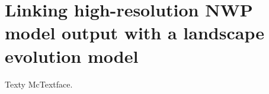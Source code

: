 \chapter{Linking high-resolution NWP model output with a landscape evolution model}

Texty McTextface.